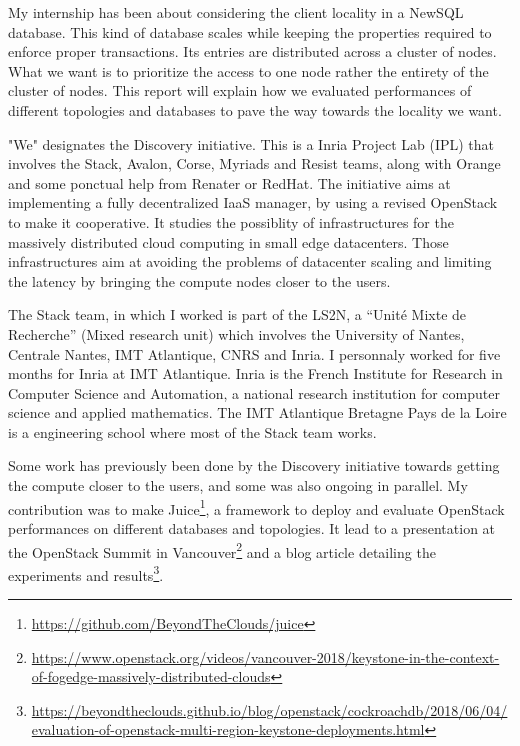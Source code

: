 My internship has been about considering the client locality in a NewSQL database. This kind of database scales while keeping the properties required to enforce proper transactions. Its entries are distributed across a cluster of nodes. What we want is to prioritize the access to one node rather the entirety of the cluster of nodes. This report will explain how we evaluated performances of different topologies and databases to pave the way towards the locality we want.

"We" designates the Discovery initiative\cite{discovery}. This is a Inria Project Lab (IPL) that involves the Stack, Avalon, Corse, Myriads and Resist teams, along with Orange and some ponctual help from Renater or RedHat. The initiative aims at implementing a fully decentralized IaaS manager, by using a revised OpenStack to make it cooperative. It studies the possiblity of infrastructures for the massively distributed cloud computing in small edge datacenters. Those infrastructures aim at avoiding the problems of datacenter scaling and limiting the latency by bringing the compute nodes closer to the users.


The Stack team, in which I worked is part of the LS2N, a ``Unité Mixte de Recherche'' (Mixed research unit) which involves the University of Nantes, Centrale Nantes, IMT Atlantique, CNRS and Inria. I personnaly worked for five months for Inria at IMT Atlantique. Inria is the French Institute for Research in Computer Science and Automation, a national research institution for computer science and applied mathematics. The IMT Atlantique Bretagne Pays de la Loire is a engineering school where most of the Stack team works.

Some work has previously been done by the Discovery initiative towards getting the compute closer to the users, and some was also ongoing in parallel. My contribution was to make Juice\footnote{\url{https://github.com/BeyondTheClouds/juice}}, a framework to deploy and evaluate OpenStack performances on different databases and topologies. It lead to a presentation at the OpenStack Summit in Vancouver\footnote{\url{https://www.openstack.org/videos/vancouver-2018/keystone-in-the-context-of-fogedge-massively-distributed-clouds}} and a blog article detailing the experiments and results\footnote{\url{https://beyondtheclouds.github.io/blog/openstack/cockroachdb/2018/06/04/evaluation-of-openstack-multi-region-keystone-deployments.html}}.
